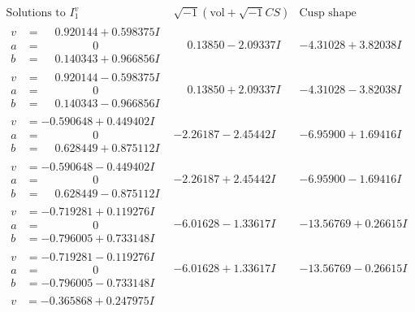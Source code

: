 \documentclass[1p]{elsarticle_modified}
\theoremstyle{definition}
\newcommand{\I}{\sqrt{-1}}
\begin{document}
$$\begin{array}{c|c|c}  
\text{Solutions to }I^v_{1}& \I (\text{vol} + \sqrt{-1}CS) & \text{Cusp shape}\\
 \hline 
\begin{aligned}
v &= \phantom{-}0.920144 + 0.598375 I \\
a &= \phantom{-0.000000 } 0 \\
b &= \phantom{-}0.140343 + 0.966856 I\end{aligned}
 & \phantom{-}0.13850 - 2.09337 I & -4.31028 + 3.82038 I \\ \hline\begin{aligned}
v &= \phantom{-}0.920144 - 0.598375 I \\
a &= \phantom{-0.000000 } 0 \\
b &= \phantom{-}0.140343 - 0.966856 I\end{aligned}
 & \phantom{-}0.13850 + 2.09337 I & -4.31028 - 3.82038 I \\ \hline\begin{aligned}
v &= -0.590648 + 0.449402 I \\
a &= \phantom{-0.000000 } 0 \\
b &= \phantom{-}0.628449 + 0.875112 I\end{aligned}
 & -2.26187 - 2.45442 I & -6.95900 + 1.69416 I \\ \hline\begin{aligned}
v &= -0.590648 - 0.449402 I \\
a &= \phantom{-0.000000 } 0 \\
b &= \phantom{-}0.628449 - 0.875112 I\end{aligned}
 & -2.26187 + 2.45442 I & -6.95900 - 1.69416 I \\ \hline\begin{aligned}
v &= -0.719281 + 0.119276 I \\
a &= \phantom{-0.000000 } 0 \\
b &= -0.796005 + 0.733148 I\end{aligned}
 & -6.01628 - 1.33617 I & -13.56769 + 0.26615 I \\ \hline\begin{aligned}
v &= -0.719281 - 0.119276 I \\
a &= \phantom{-0.000000 } 0 \\
b &= -0.796005 - 0.733148 I\end{aligned}
 & -6.01628 + 1.33617 I & -13.56769 - 0.26615 I \\ \hline\begin{aligned}
v &= -0.365868 + 0.247975 I \\

\end{aligned}
\end{array}$$
\end{document}
